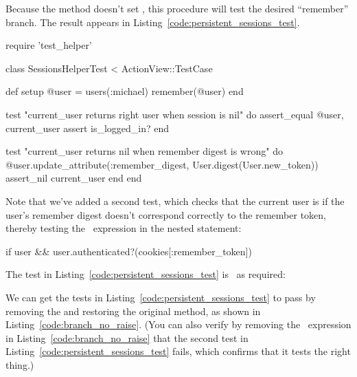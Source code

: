 \noindent Because the  method doesn't set , this procedure will test the desired ``remember'' branch. The result appears in Listing~\ref{code:persistent_sessions_test}.

\begin{codelisting}
\label{code:persistent_sessions_test}
\begin{code}
require 'test_helper'

class SessionsHelperTest < ActionView::TestCase

  def setup
    @user = users(:michael)
    remember(@user)
  end

  test "current_user returns right user when session is nil" do
    assert_equal @user, current_user
    assert is_logged_in?
  end

  test "current_user returns nil when remember digest is wrong" do
    @user.update_attribute(:remember_digest, User.digest(User.new_token))
    assert_nil current_user
  end
end
\end{code}
\end{codelisting}

\noindent Note that we've added a second test, which checks that the current user is  if the user's remember digest doesn't correspond correctly to the remember token, thereby testing the \ expression in the nested  statement:

\begin{code}
if user && user.authenticated?(cookies[:remember_token])
\end{code}

The test in Listing~\ref{code:persistent_sessions_test} is \failing\ as required:

\begin{codelisting}
\codecaption{\failing}
\end{codelisting}

We can get the tests in Listing~\ref{code:persistent_sessions_test} to pass by removing the  and restoring the original  method, as shown in Listing~\ref{code:branch_no_raise}. (You can also verify by removing the \ expression in Listing~\ref{code:branch_no_raise} that the second test in Listing~\ref{code:persistent_sessions_test} fails, which confirms that it tests the right thing.)

